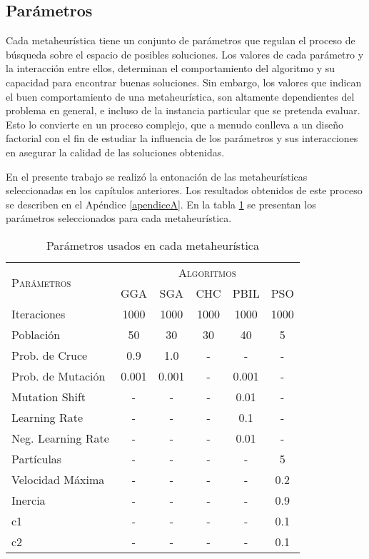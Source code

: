 \subsection{Parámetros}

Cada metaheurística tiene un conjunto de parámetros que regulan el proceso de búsqueda sobre el espacio de posibles soluciones. Los valores de cada parámetro y la interacción entre ellos, determinan el comportamiento del algoritmo y su capacidad para encontrar buenas soluciones. Sin embargo, los valores que indican el buen comportamiento de una metaheurística, son altamente dependientes del problema en general, e incluso de la instancia particular que se pretenda evaluar. Esto lo convierte en un proceso complejo, que a menudo conlleva a un diseño factorial con el fin de estudiar la influencia de los parámetros y sus interacciones en asegurar la calidad de las soluciones obtenidas.

En el presente trabajo se realizó la entonación de las metaheurísticas seleccionadas en los capítulos anteriores. Los resultados obtenidos de este proceso se describen en el Apéndice \ref{apendiceA}. En la tabla \ref{table-parameters} se presentan los parámetros seleccionados para cada metaheurística.

\begin{table}[h!]
\centering
\begin{tabular}{l c c c c c}
\hline
\multirow{2}{*}{\textsc{Parámetros}}
	& \multicolumn{5}{c}{\textsc{Algoritmos}} \\\cline{2-6}
	& GGA & SGA & CHC & PBIL & PSO \\
\hline
\hline
Iteraciones        &  1000 &  1000 &  1000 &  1000 &  1000 \\
Población          &    50 &    30 &    30 &    40 &     5 \\
Prob. de Cruce     &   0.9 &   1.0 &     - &     - &     - \\
Prob. de Mutación  & 0.001 & 0.001 &     - & 0.001 &     - \\
Mutation Shift     &     - &     - &     - &  0.01 &     - \\
Learning Rate      &     - &     - &     - &   0.1 &     - \\
Neg. Learning Rate &     - &     - &     - &  0.01 &     - \\
Partículas         &     - &     - &     - &     - &     5 \\
Velocidad Máxima   &     - &     - &     - &     - &   0.2 \\
Inercia            &     - &     - &     - &     - &   0.9 \\
c1                 &     - &     - &     - &     - &   0.1 \\
c2                 &     - &     - &     - &     - &   0.1 \\
\hline
\end{tabular}
\caption{Parámetros usados en cada metaheurística}
\label{table-parameters}
\end{table}

